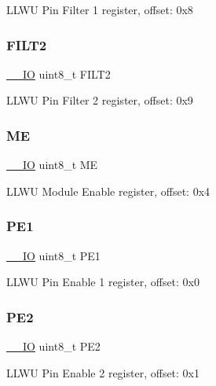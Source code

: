 L\+L\+WU Pin Filter 1 register, offset\+: 0x8 \mbox{\label{struct_l_l_w_u___type_a5704aaa9940312ccd60ee44f31932094}} 
\subsubsection{\texorpdfstring{FILT2}{FILT2}}
{\footnotesize\ttfamily \mbox{\hyperlink{core__cm0plus_8h_aec43007d9998a0a0e01faede4133d6be}{\+\_\+\+\_\+\+IO}} uint8\+\_\+t F\+I\+L\+T2}

L\+L\+WU Pin Filter 2 register, offset\+: 0x9 \mbox{\label{struct_l_l_w_u___type_aaafdc4eddd9d9e84f3175cf74e29f1b0}} 
\subsubsection{\texorpdfstring{ME}{ME}}
{\footnotesize\ttfamily \mbox{\hyperlink{core__cm0plus_8h_aec43007d9998a0a0e01faede4133d6be}{\+\_\+\+\_\+\+IO}} uint8\+\_\+t ME}

L\+L\+WU Module Enable register, offset\+: 0x4 \mbox{\label{struct_l_l_w_u___type_aa97f1aae59ce6efd1a22b9ca279058f0}} 
\subsubsection{\texorpdfstring{PE1}{PE1}}
{\footnotesize\ttfamily \mbox{\hyperlink{core__cm0plus_8h_aec43007d9998a0a0e01faede4133d6be}{\+\_\+\+\_\+\+IO}} uint8\+\_\+t P\+E1}

L\+L\+WU Pin Enable 1 register, offset\+: 0x0 \mbox{\label{struct_l_l_w_u___type_a995e13620d64851a128d6d2e03b6713e}} 
\subsubsection{\texorpdfstring{PE2}{PE2}}
{\footnotesize\ttfamily \mbox{\hyperlink{core__cm0plus_8h_aec43007d9998a0a0e01faede4133d6be}{\+\_\+\+\_\+\+IO}} uint8\+\_\+t P\+E2}

L\+L\+WU Pin Enable 2 register, offset\+: 0x1 \mbox{\label{struct_l_l_w_u___type_ae66b179d39862bb7d0f8ba9b4c2c58a8}} 
